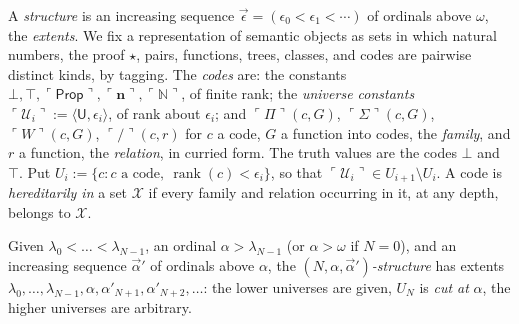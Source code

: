 \documentclass[10pt]{article}
\newcommand{\N}{\mathbb{N}}
\newcommand{\Prop}{\mathsf{Prop}}
\newcommand{\rk}{\operatorname{rank}}
\newcommand{\code}[1]{\ulcorner #1\urcorner}
\newcommand{\U}{\mathcal{U}}
\newcommand{\X}{\mathcal{X}}
\begin{document}
\begin{definition}\label{def:codes}
A \emph{structure} is an increasing sequence
$\vec\epsilon=(\epsilon_0<\epsilon_1<\cdots)$ of ordinals above $\omega$,
the \emph{extents}. We fix a representation of semantic objects as sets
in which natural numbers, the proof $\star$, pairs, functions, trees,
classes, and codes are pairwise distinct kinds, by tagging. The
\emph{codes} are: the constants $\bot,\top,\code\Prop,\code{\mathbf n},\code\N$,
of finite rank; the \emph{universe constants}
$\code{\U_i}:=\langle\mathsf U,\epsilon_i\rangle$, of rank about $\epsilon_i$;
and $\code\Pi(c,G)$, $\code\Sigma(c,G)$, $\code W(c,G)$, $\code/(c,r)$ for $c$
a code, $G$ a function into codes, the \emph{family}, and $r$ a function,
the \emph{relation}, in curried form. The truth
values are the codes $\bot$ and $\top$. Put $U_i:=\{c:c\text{ a code},\ \rk(c)<\epsilon_i\}$,
so that $\code{\U_i}\in U_{i+1}\setminus U_i$. A code is
\emph{hereditarily in} a set $\X$ if every family and relation occurring
in it, at any depth, belongs to $\X$.

Given $\lambda_0<\dots<\lambda_{N-1}$, an ordinal
$\alpha>\lambda_{N-1}$ (or $\alpha>\omega$ if $N=0$), and an increasing
sequence $\vec\alpha'$ of ordinals above $\alpha$, the
\emph{$(N,\alpha,\vec\alpha')$-structure} has extents
$\lambda_0,\dots,\lambda_{N-1},\alpha,\alpha'_{N+1},\alpha'_{N+2},\dots$:
the lower universes are given, $U_N$ is \emph{cut at} $\alpha$, the higher
universes are arbitrary.
\end{definition}
\end{document}
